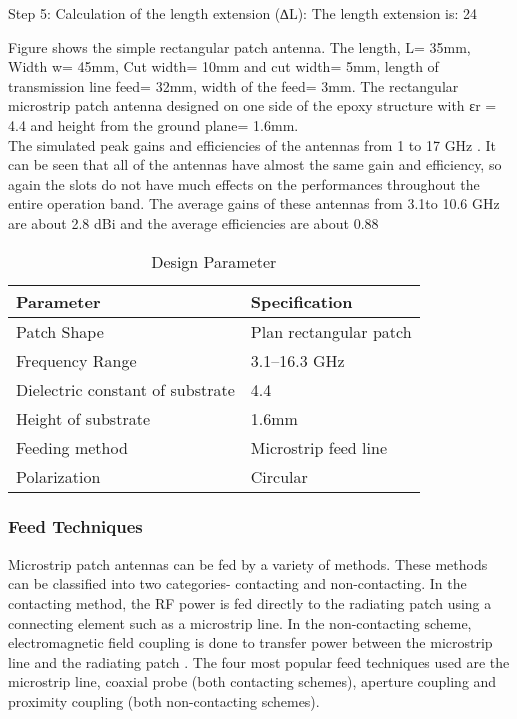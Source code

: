 \documentclass[12pt]{article}
\begin{document}
         Step 5: Calculation of the length extension (∆L):
         The length extension is:     24

         Figure shows the simple rectangular patch antenna.
         The length, L= 35mm,
         Width w= 45mm,
         Cut width= 10mm
         and cut width= 5mm,
         length of transmission line feed= 32mm,
         width of the feed= 3mm.
         The rectangular microstrip patch antenna designed on one side of the epoxy structure with εr = 4.4 and height from the ground plane= 1.6mm. \\



         The simulated peak gains and efficiencies of the antennas from 1 to 17 GHz . It can be seen that all of the antennas have almost the same gain and efficiency, so again the slots do not have much effects on the performances throughout the entire operation band. The average gains of these antennas from 3.1to 10.6 GHz are about 2.8 dBi and the average efficiencies are about 0.88

         \begin{center}
         		\begin{table}[H]
         			\centering
         			\begin{tabular}{ |l|l|}
         				\hline
         				Parameter & Specification \\ \hline
         				Patch Shape &  Plan rectangular patch \\ \hline
         				Frequency Range &  3.1–16.3 GHz \\ \hline
         				Dielectric constant of substrate & 4.4 \\ \hline
         				Height of substrate &   1.6mm \\ \hline
         				Feeding method &  Microstrip feed line \\ \hline
         				Polarization &  Circular \\ \hline
         			\end{tabular}
         			\caption{Design Parameter}
         		\end{table}
         \end{center}

        \subsubsection{Feed Techniques}
          \justify
           Microstrip patch antennas can be fed by a variety of methods. These methods can be
           classified into two categories- contacting and non-contacting. In the contacting method, the RF power is fed directly to the radiating patch using a connecting element such as a microstrip line. In the non-contacting scheme, electromagnetic field coupling is done to transfer power between the microstrip line and the radiating patch . The four most popular feed techniques used are the microstrip line, coaxial probe (both contacting schemes), aperture coupling and proximity coupling (both non-contacting schemes).
\end{document}
